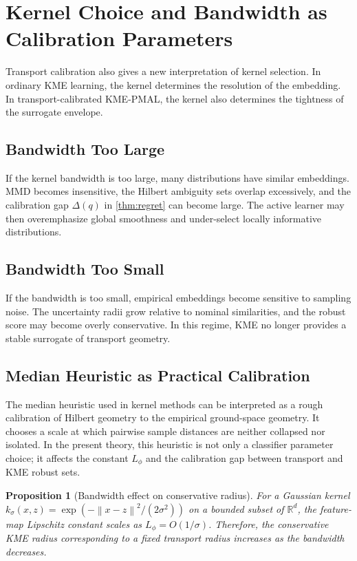 \documentclass[10pt,journal]{IEEEtran}
\newtheorem{proposition}{Proposition}
\newcommand{\R}{\mathbb{R}}
\newcommand{\norm}[1]{\left\lVert #1 \right\rVert}
\begin{document}
\section{Kernel Choice and Bandwidth as Calibration Parameters}
\label{sec:kernel-choice}

Transport calibration also gives a new interpretation of kernel selection. In ordinary KME learning, the kernel determines the resolution of the embedding. In transport-calibrated KME-PMAL, the kernel also determines the tightness of the surrogate envelope.

\subsection{Bandwidth Too Large}

If the kernel bandwidth is too large, many distributions have similar embeddings. MMD becomes insensitive, the Hilbert ambiguity sets overlap excessively, and the calibration gap $\Delta(q)$ in \cref{thm:regret} can become large. The active learner may then overemphasize global smoothness and under-select locally informative distributions.

\subsection{Bandwidth Too Small}

If the bandwidth is too small, empirical embeddings become sensitive to sampling noise. The uncertainty radii grow relative to nominal similarities, and the robust score may become overly conservative. In this regime, KME no longer provides a stable surrogate of transport geometry.

\subsection{Median Heuristic as Practical Calibration}

The median heuristic used in kernel methods can be interpreted as a rough calibration of Hilbert geometry to the empirical ground-space geometry. It chooses a scale at which pairwise sample distances are neither collapsed nor isolated. In the present theory, this heuristic is not only a classifier parameter choice; it affects the constant $L_\phi$ and the calibration gap between transport and KME robust sets.

\begin{proposition}[Bandwidth effect on conservative radius]
For a Gaussian kernel $k_\sigma(x,z)=\exp(-\norm{x-z}^2/(2\sigma^2))$ on a bounded subset of $\R^d$, the feature-map Lipschitz constant scales as $L_\phi=O(1/\sigma)$. Therefore, the conservative KME radius corresponding to a fixed transport radius increases as the bandwidth decreases.
\end{proposition}
\end{document}
